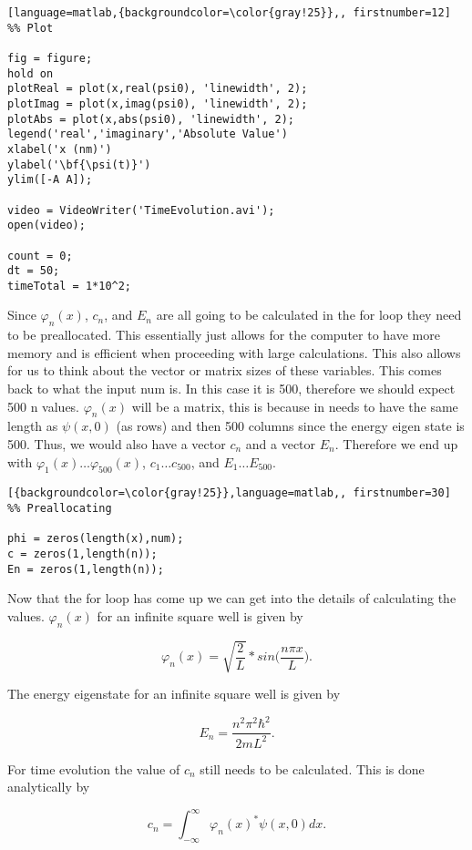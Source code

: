 \documentclass{article}
\begin{document}
\begin{lstlisting}[language=matlab,{backgroundcolor=\color{gray!25}},, firstnumber=12]
%% Plot

fig = figure;
hold on
plotReal = plot(x,real(psi0), 'linewidth', 2);
plotImag = plot(x,imag(psi0), 'linewidth', 2);
plotAbs = plot(x,abs(psi0), 'linewidth', 2);
legend('real','imaginary','Absolute Value')
xlabel('x (nm)')
ylabel('\bf{\psi(t)}')
ylim([-A A]);

video = VideoWriter('TimeEvolution.avi');
open(video);

count = 0;
dt = 50;
timeTotal = 1*10^2;
\end{lstlisting}

Since $\varphi_n(x)$, $c_n$, and $E_{n}$ are all going to be calculated in the for loop they need to be preallocated. This essentially just allows for the computer to have more memory and is efficient when proceeding with large calculations. This also allows for us to think about the vector or matrix sizes of these variables. This comes back to what the input num is. In this case it is 500, therefore we should expect 500 n values. $\varphi_n(x)$ will be a matrix, this is because in needs to have the same length as $\psi(x,0)$ (as rows) and then 500 columns since the energy eigen state is 500. Thus, we would also have a vector $c_n$ and a vector $E_n$. Therefore we end up with $\varphi_1(x) \dots \varphi_{500}(x)$, $c_1 \dots c_{500}$, and $E_1 \dots E_{500}$.

\begin{lstlisting}[{backgroundcolor=\color{gray!25}},language=matlab,, firstnumber=30]
%% Preallocating

phi = zeros(length(x),num);
c = zeros(1,length(n));
En = zeros(1,length(n));

\end{lstlisting}

\newpage

Now that the for loop has come up we can get into the details of calculating the values. $\varphi_n(x)$ for an infinite square well is given by

$$
\varphi_n(x) = \sqrt{\frac{2}{L}}*sin\Big(\frac{n\pi x}{L}\Big).
$$

The energy eigenstate for an infinite square well is given by

$$
E_n = \frac{n^2\pi^2 \hbar^2}{2mL^2}.
$$

For time evolution the value of $c_{n}$ still needs to be calculated. This is done analytically by

$$
c_n = \int_{-\infty}^{\infty} \varphi_n(x)^{*} \psi(x,0) dx.
$$
\end{document}
